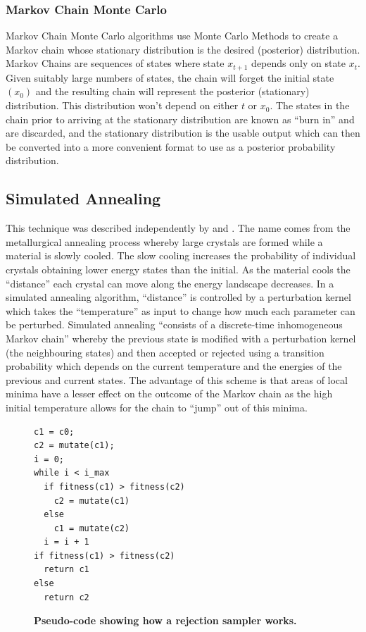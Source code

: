 \subsubsection*{Markov Chain Monte Carlo}
Markov Chain Monte Carlo algorithms use Monte Carlo Methods to create a Markov chain whose stationary distribution is the desired (posterior) distribution. Markov Chains are sequences of states where state $x_{t+1}$ depends only on state $x_t$. Given suitably large numbers of states, the chain will forget the initial state $(x_0)$ and the resulting chain will represent the posterior (stationary) distribution. This distribution won't depend on either $t$ or $x_0$\cite{Gilks1996}. The states in the chain prior to arriving at the stationary distribution are known as ``burn in'' and are discarded, and the stationary distribution is the usable output which can then be converted into a more convenient format to use as a posterior probability distribution.

\subsection{Simulated Annealing}
This technique was described independently by \citet{Kirkpatrick1983} and \citet{Cerny1985}. The name comes from the metallurgical annealing process whereby large crystals are formed while a material is slowly cooled. The slow cooling increases the probability of individual crystals obtaining lower energy states than the initial. As the material cools the ``distance'' each crystal can move along the energy landscape decreases. In a simulated annealing algorithm, ``distance'' is controlled by a perturbation kernel which takes the ``temperature'' as input to change how much each parameter can be perturbed.
Simulated annealing ``consists of a discrete-time inhomogeneous Markov chain''\cite{Bertsimas1993} whereby the previous state is modified with a perturbation kernel (the neighbouring states) and then accepted or rejected using a transition probability which depends on the current temperature and the energies of the previous and current states. The advantage of this scheme is that areas of local minima have a lesser effect on the outcome of the Markov chain as the high initial temperature allows for the chain to ``jump'' out of this minima.
\begin{figure}[tbp]
\small
\begin{verbatim}
c1 = c0;
c2 = mutate(c1);
i = 0;
while i < i_max
  if fitness(c1) > fitness(c2)
    c2 = mutate(c1)
  else
    c1 = mutate(c2)
  i = i + 1
if fitness(c1) > fitness(c2)
  return c1
else
  return c2
\end{verbatim}
\caption[Pseudo-code showing how a rejection sampler works.]{{\bf Pseudo-code showing how a rejection sampler works.}
\label{fig:sa_code}}
\end{figure}


